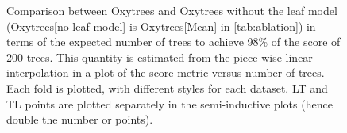 \begin{appendices}
\begin{figure}
 
    \caption{
    Comparison between Oxytrees and Oxytrees without the leaf model (Oxytrees[no leaf model] is Oxytrees[Mean] in \cref{tab:ablation})
    in terms of the expected number of trees to achieve 98\% of the score of 200 trees. This quantity is estimated from the piece-wise linear interpolation in a plot of the score metric versus number of trees.
    Each fold is plotted, with different styles for each dataset. LT and TL points are plotted separately in the semi-inductive plots (hence double the number or points).}
    \label{fig:number of trees no leaf model}
\end{figure}

\FloatBarrier



\end{appendices}
